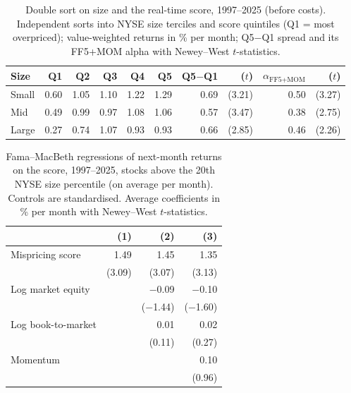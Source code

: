 \documentclass[12pt,a4paper]{article}
\begin{document}
\begin{singlespace}
\begin{table}[!htbp]\centering
\caption{Double sort on size and the real-time score, 1997--2025 (before costs). Independent sorts into NYSE size terciles and score quintiles (Q1 = most overpriced); value-weighted returns in \% per month; Q5$-$Q1 spread and its FF5+MOM alpha with Newey--West $t$-statistics.}\label{tab:size}
\footnotesize
\begin{tabular}{lrrrrrrrrr}\toprule
Size & Q1 & Q2 & Q3 & Q4 & Q5 & Q5$-$Q1 & ($t$) & $\alpha_{\text{FF5+MOM}}$ & ($t$)\\\midrule
Small & 0.60 & 1.05 & 1.10 & 1.22 & 1.29 & 0.69 & (3.21) & 0.50 & (3.27)\\
Mid & 0.49 & 0.99 & 0.97 & 1.08 & 1.06 & 0.57 & (3.47) & 0.38 & (2.75)\\
Large & 0.27 & 0.74 & 1.07 & 0.93 & 0.93 & 0.66 & (2.85) & 0.46 & (2.26)\\
\bottomrule\end{tabular}
\end{table}

\begin{table}[!htbp]\centering
\caption{Fama--MacBeth regressions of next-month returns on the score, 1997--2025, stocks above the 20th NYSE size percentile (on average \fmn{} per month). Controls are standardised. Average coefficients in \% per month with Newey--West $t$-statistics.}\label{tab:fm}
\footnotesize
\begin{tabular}{lrrr}\toprule
 & (1) & (2) & (3)\\\midrule
Mispricing score & 1.49 & 1.45 & 1.35\\
 & (3.09) & (3.07) & (3.13)\\
Log market equity & & \ensuremath{-}0.09 & \ensuremath{-}0.10\\
 & & (\ensuremath{-}1.44) & (\ensuremath{-}1.60)\\
Log book-to-market & & 0.01 & 0.02\\
 & & (0.11) & (0.27)\\
Momentum & & & 0.10\\
 & & & (0.96)\\
\bottomrule\end{tabular}
\end{table}


\end{singlespace}
\end{document}

